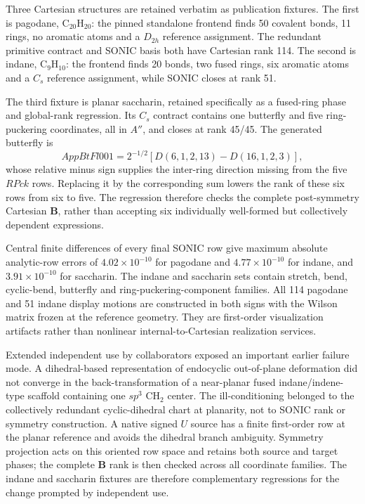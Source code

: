 \documentclass[10pt]{article}
\newcommand{\Bmat}{\mathbf{B}}
\begin{document}
Three Cartesian structures are retained verbatim as publication fixtures.  The
first is pagodane, \(\mathrm{C}_{20}\mathrm{H}_{20}\): the pinned standalone
frontend finds 50 covalent bonds, 11 rings, no aromatic atoms and a
\(D_{2h}\) reference assignment.  The redundant primitive contract and SONIC
basis both have Cartesian rank 114.  The second is indane,
\(\mathrm{C}_{9}\mathrm{H}_{10}\): the frontend finds 20 bonds, two fused
rings, six aromatic atoms and a \(C_s\) reference assignment, while SONIC closes
at rank 51.

The third fixture is planar saccharin, retained specifically as a fused-ring
phase and global-rank regression.  Its \(C_s\) contract contains one butterfly
and five ring-puckering coordinates, all in \(A''\), and closes at rank 45/45.
The generated butterfly is
\begin{equation}
 AppBtFl001=2^{-1/2}\!\left[D(6,1,2,13)-D(16,1,2,3)\right],
\end{equation}
whose relative minus sign supplies the inter-ring direction missing from the
five \(RPck\) rows.  Replacing it by the corresponding sum lowers the rank of
these six rows from six to five.  The regression therefore checks the complete
post-symmetry Cartesian \(\Bmat\), rather than accepting six individually
well-formed but collectively dependent expressions.

Central finite differences of every final SONIC row give maximum absolute
analytic-row errors of \(4.02\times10^{-10}\) for pagodane and
\(4.77\times10^{-10}\) for indane, and \(3.91\times10^{-10}\) for saccharin.
The indane and saccharin sets contain stretch, bend,
cyclic-bend, butterfly and ring-puckering-component families.  All 114 pagodane
and 51 indane display motions are constructed in both signs with the Wilson
matrix frozen at the reference geometry.  They are first-order visualization
artifacts rather than nonlinear internal-to-Cartesian realization services.

Extended independent use by collaborators exposed an important earlier
failure mode.  A dihedral-based representation of endocyclic out-of-plane
deformation did not converge in the back-transformation of a near-planar fused
indane/indene-type scaffold containing one \(sp^3\) CH\(_2\) center.  The
ill-conditioning belonged to the collectively redundant cyclic-dihedral chart
at planarity, not to SONIC rank or symmetry construction.  A native signed
\(U\) source has a finite first-order row at the planar reference and avoids
the dihedral branch ambiguity.  Symmetry projection acts on this oriented
row space and retains both source and target phases; the complete \(\Bmat\)
rank is then checked across all coordinate families.  The indane and
saccharin fixtures are therefore complementary regressions for the change
prompted by independent use.
\end{document}
